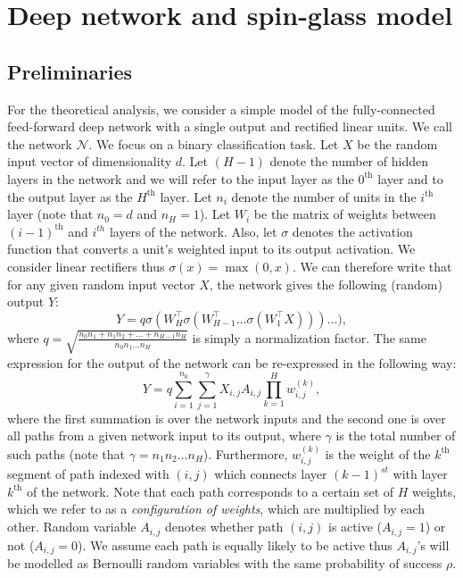 \documentclass[twoside]{article}
\begin{document}
\section{Deep network and spin-glass model}
\label{sec:NNSG}

\subsection{Preliminaries}

For the theoretical analysis, we consider a simple model of the fully-connected feed-forward deep network with a single output and rectified linear units. We call the network $\mathcal{N}$. We focus on a binary classification task. Let $X$ be the random input vector of dimensionality $d$. Let $(H-1)$ denote the number of hidden layers in the network and we will refer to the input layer as the $0^{\text{th}}$ layer and to the output layer as the $H^{\text{th}}$ layer. Let $n_i$ denote the number of units in the $i^{\text{th}}$ layer (note that $n_0 = d$ and $n_H = 1$). Let $W_i$ be the matrix of weights between $(i - 1)^{\text{th}}$ and $i^{th}$ layers of the network. Also, let $\sigma$ denotes the activation function that converts a unit's weighted input to its output activation. We consider linear rectifiers thus $\sigma(x) = \max(0,x)$. We can therefore write that for any given random input vector $X$, the network gives the following (random) output $Y$:
\[Y = q\sigma(W_H^{\top}\sigma(W_{H-1}^{\top}\dots\sigma(W_1^{\top}X)))\dots),
\]
where $q = \sqrt{\frac{n_0n_1 + n_1n_2 + ... + n_{H-1}n_H}{n_0n_1...n_H}}$ is simply a normalization factor. The same expression for the output of the network can be re-expressed in the following way:
\begin{equation}
Y = q\sum_{i=1}^{n_0}\sum_{j = 1}^\gamma X_{i,j}A_{i,j}\prod_{k = 1}^{H}w_{i,j}^{(k)},
\label{eq:befrein}
\end{equation}
where the first summation is over the network inputs and the second one is over all paths from a given network input to its output, where $\gamma$ is the total number of such paths (note that $\gamma = n_1n_2\dots n_H$). Furthermore, $w_{i,j}^{(k)}$ is the weight of the $k^{\text{th}}$ segment of path indexed with $(i,j)$ which connects layer $(k-1)^{st}$ with layer $k^{\text{th}}$ of the network. Note that each path corresponds to a certain set of $H$ weights, which we refer to as a \textit{configuration of weights}, which are multiplied by each other. Random variable $A_{i,j}$ denotes whether path $(i,j)$ is active ($A_{i,j} = 1$) or not ($A_{i,j} = 0$).  We assume each path is equally likely to be active thus $A_{i,j}$'s will be modelled as Bernoulli random variables with the same probability of success $\rho$. 
\end{document}
